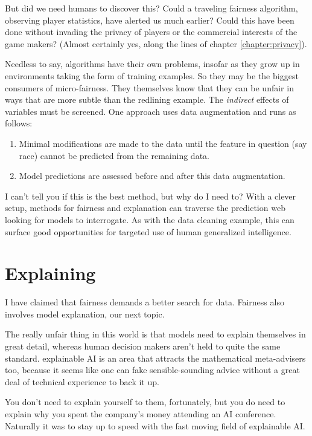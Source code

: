 But did we need humans to discover this? Could a traveling fairness algorithm, observing player statistics, have alerted us much earlier? Could this have been done without invading the privacy of players or the commercial interests of the game makers? (Almost certainly yes, along the lines of chapter \ref{chapter:privacy}).

Needless to say, algorithms have their own problems, insofar as they grow up in environments taking the form of training examples. So they may be the biggest consumers of micro-fairness. They themselves know that they can be unfair in ways that are more subtle than the redlining example. The {\em indirect} effects of variables must be screened. One approach uses data augmentation and runs as follows:
\begin{enumerate}
	\item Minimal modifications are made to the data until the feature in question (say race) cannot be predicted from the remaining data.
	\item Model predictions are assessed before and after this data augmentation.
\end{enumerate}
I can't tell you if this is the best method, but why do I need to? With a clever setup, methods for fairness and explanation can traverse the prediction web looking for models to interrogate. As with the data cleaning example, this can surface good opportunities for targeted use of human generalized intelligence. 

\section{Explaining}
\label{sec:explaining}

I have claimed that fairness demands a better search for data. Fairness also involves model explanation, our next topic. 

The really unfair thing in this world is that models need to explain themselves in great detail, whereas human decision makers aren't held to quite the same standard. explainable AI is an area that attracts the mathematical meta-advisers too, because it seems like one can fake sensible-sounding advice without a great deal of technical experience to back it up. 

You don't need to explain yourself to them, fortunately, but you do need to explain why you spent the company's money attending an AI conference. Naturally it was to stay up to speed with the fast moving field of explainable AI. 


